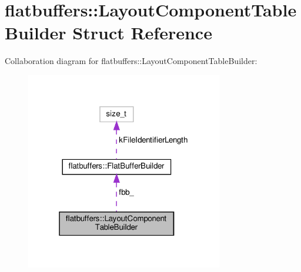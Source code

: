 \hypertarget{structflatbuffers_1_1LayoutComponentTableBuilder}{}\section{flatbuffers\+:\+:Layout\+Component\+Table\+Builder Struct Reference}
\label{structflatbuffers_1_1LayoutComponentTableBuilder}


Collaboration diagram for flatbuffers\+:\+:Layout\+Component\+Table\+Builder\+:
\nopagebreak
\begin{figure}[H]
\begin{center}
\leavevmode
\includegraphics[width=244pt]{structflatbuffers_1_1LayoutComponentTableBuilder__coll__graph}
\end{center}
\end{figure}
